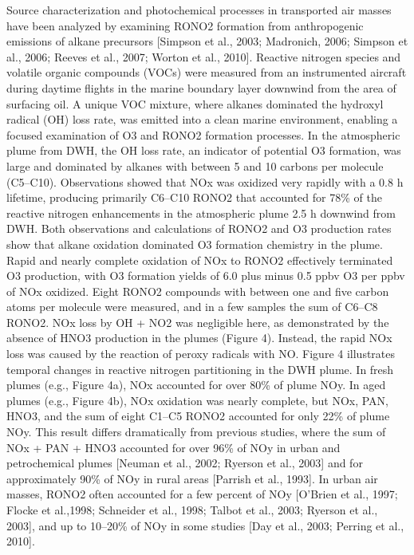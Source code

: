 \documentclass[11pt,a4paper]{article}
\begin{document}
\citep{Neuman2012}
Source characterization and photochemical processes in transported air masses have been analyzed by examining RONO2 formation from anthropogenic emissions of alkane precursors [Simpson et al., 2003; Madronich, 2006; Simpson et al., 2006; Reeves et al., 2007; Worton et al., 2010].
Reactive nitrogen species and volatile organic compounds (VOCs) were measured from an instrumented aircraft during daytime flights in the marine boundary layer downwind from the area of surfacing oil. A unique VOC mixture, where alkanes dominated the hydroxyl radical (OH) loss rate, was emitted into a clean marine environment, enabling a focused examination of O3 and RONO2 formation processes. In the atmospheric plume from DWH, the OH loss rate, an indicator of potential O3 formation, was large and dominated by alkanes with between 5 and 10 carbons per molecule (C5–C10). Observations showed that NOx was oxidized very rapidly with a 0.8 h lifetime, producing primarily C6–C10 RONO2 that accounted for 78\% of the reactive nitrogen enhancements in the atmospheric plume 2.5 h downwind from DWH. Both observations and calculations of RONO2 and O3 production rates show that alkane oxidation dominated O3 formation chemistry in the plume. Rapid and nearly complete oxidation of NOx to RONO2 effectively terminated O3 production, with O3 formation
yields of 6.0 plus minus 0.5 ppbv O3 per ppbv of NOx oxidized.
Eight RONO2 compounds with between one and five carbon atoms
per molecule were measured, and in a few samples the sum of C6–C8 RONO2.
NOx loss by OH + NO2 was negligible here, as demonstrated by the absence of HNO3 production in the plumes (Figure 4). Instead, the rapid NOx loss was caused by the reaction of peroxy radicals with NO.
Figure 4 illustrates temporal changes in reactive nitrogen partitioning in the DWH plume. In fresh plumes (e.g., Figure 4a), NOx accounted for over 80\% of plume NOy. In aged plumes (e.g., Figure 4b), NOx oxidation was nearly complete, but NOx, PAN, HNO3, and the sum of eight C1–C5 RONO2 accounted for only 22\% of plume NOy. This result differs dramatically from previous studies, where the sum of NOx + PAN + HNO3 accounted for over 96\% of NOy in urban and petrochemical plumes [Neuman et al., 2002; Ryerson et al., 2003] and for approximately 90\% of NOy in rural areas [Parrish et al., 1993]. In urban air masses, RONO2 often accounted for a few percent of NOy [O’Brien et al., 1997; Flocke et al.,1998; Schneider et al., 1998; Talbot et al., 2003; Ryerson et al., 2003], and up to 10–20\% of NOy in some studies [Day et al., 2003; Perring et al., 2010].
\end{document}
